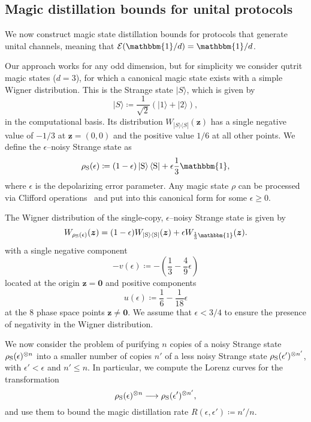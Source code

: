 \documentclass[
onecolumn,
superscriptaddress
]{revtex4-1}
\def\>{\rangle}
\def\<{\langle}
\def\id{\mathbbm{1}}
\def\bmo{\boldsymbol{0}}
\def\z{\boldsymbol{z}}
\def\E{{\cal E}}
\begin{document}
\subsection*{Magic distillation bounds for unital protocols}

We now construct magic state distillation bounds for protocols that generate unital channels, meaning that $\E(\id/d) = \id/d$.

Our approach works for any odd dimension, but for simplicity we consider qutrit magic states ($d=3$), for which a canonical magic state exists with a simple Wigner distribution. This is the Strange state $|S\>$, which is given by
\begin{equation}
|S\> \coloneqq \frac{1}{\sqrt{2}} (|1\> + |2\>),
\end{equation}
in the computational basis. Its distribution $W_{|S\>\<S|}(\z)$ has a single negative value of $-1/3$ at $\z =(0,0)$ and the positive value $1/6$ at all other points. We define the $\epsilon$--noisy Strange state as
\begin{equation}\label{eq:noisysn}
    \rho_{\rm{S}}(\epsilon)\coloneqq (1 - \epsilon) \ket{\rm{S}}\bra{\rm{S}} + \epsilon \frac{1}{3}\id,
\end{equation}
where $\epsilon$ is the depolarizing error parameter. Any magic state $\rho$ can be processed via Clifford operations~\cite{cit:prakash,cit:prakash2} and put into this canonical form for some $\epsilon \ge 0$.

The Wigner distribution of the single-copy, $\epsilon$--noisy Strange state  is given by
\begin{equation}
	W_{\rho_{\rm{S}}(\epsilon)}(\z) = (1-\epsilon)W_{|\rm{S}\>\<\rm{S}|}(\z) + \epsilon W_{\frac{1}{3}\id}(\z).
\end{equation}
with a single negative component
\begin{equation}
	- v(\epsilon) \coloneqq - \left( \frac{1}{3} -\frac{4}{9}\epsilon \right)
\end{equation} 
located at the origin $\z = \bmo$ and positive components
\begin{equation}
	u(\epsilon) \coloneqq \frac{1}{6} -\frac{1}{18}\epsilon
\end{equation}
at the 8 phase space points $\z \ne \bmo$. We assume that $\epsilon < 3/4$ to ensure the presence of negativity in the Wigner distribution. 

We now consider the problem of purifying $n$ copies of a noisy Strange state $\rho_{\rm{S}}(\epsilon)^{\otimes n}$ into a smaller number of copies $n'$ of a less noisy Strange state $\rho_{\rm{S}}(\epsilon')^{\otimes n'}$, with $\epsilon' < \epsilon$ and $n' \leq n$. In particular, we compute the Lorenz curves for the transformation
\begin{equation}\label{eq:sudist}
	\rho_{\rm{S}}(\epsilon)^{\otimes n} \longrightarrow \rho_{\rm{S}}(\epsilon')^{\otimes n'},
\end{equation}
and use them to bound the magic distillation rate $R(\epsilon, \epsilon') \coloneqq n'/n$.
\end{document}
